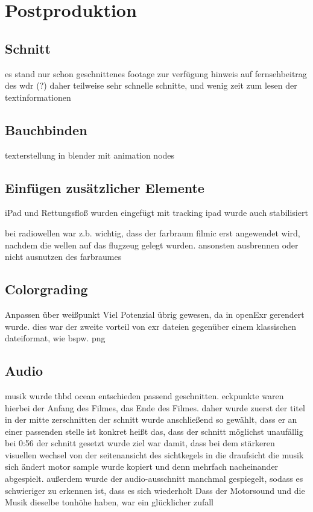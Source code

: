 \chapter{Postproduktion}

\section{Schnitt}

es stand nur schon geschnittenes footage zur verfügung
hinweis auf fernsehbeitrag des wdr (?)
daher teilweise sehr schnelle schnitte, und wenig zeit zum lesen der textinformationen

\section{Bauchbinden}

texterstellung in blender mit animation nodes

\section{Einfügen zusätzlicher Elemente}

iPad und Rettungsfloß wurden eingefügt mit tracking
ipad wurde auch stabilisiert

bei radiowellen war z.b. wichtig, dass der farbraum filmic erst angewendet wird, nachdem die wellen auf das flugzeug gelegt wurden. ansonsten ausbrennen oder nicht ausnutzen des farbraumes


\section{Colorgrading}

Anpassen über weißpunkt
Viel Potenzial übrig gewesen, da in openExr gerendert wurde.
dies war der zweite vorteil von exr dateien gegenüber einem klassischen dateiformat, wie bspw. png

\section{Audio}

musik wurde thbd ocean entschieden
passend geschnitten. eckpunkte waren hierbei der Anfang des Filmes, das Ende des Filmes.
daher wurde zuerst der titel in der mitte zerschnitten
der schnitt wurde anschließend so gewählt, dass er an einer passenden stelle ist
konkret heißt das, dass der schnitt möglichst unaufällig bei 0:56 der schnitt gesetzt wurde
ziel war damit, dass bei dem stärkeren visuellen wechsel von der seitenansicht des sichtkegels in die draufsicht die musik sich ändert
motor sample wurde kopiert und denn mehrfach nacheinander abgespielt. außerdem wurde der audio-ausschnitt manchmal gespiegelt, sodass es schwieriger zu erkennen ist, dass es sich wiederholt
Dass der Motorsound und die Musik dieselbe tonhöhe haben, war ein glücklicher zufall
